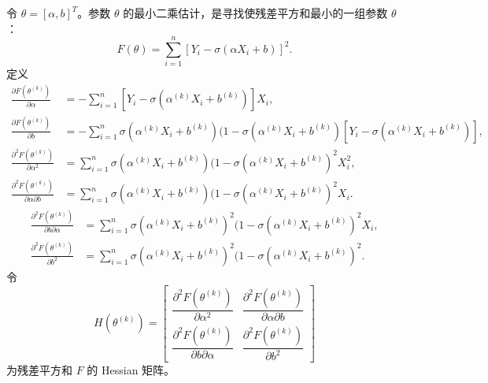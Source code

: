 令 $\theta=[\alpha,b]^T$。参数 $\theta$ 的最小二乘估计，是寻找使残差平方和最小的一组参数 $\theta$：
\begin{equation}
F(\theta)=\sum_{i=1}^n[Y_i-\sigma(\alpha X_i+b)]^2.
\tag{5.13}
\end{equation}
定义
\begin{equation}
\begin{aligned}
\frac{\partial F(\theta^{(k)})}{\partial\alpha}
&=-\sum_{i=1}^n[Y_i-\sigma(\alpha^{(k)}X_i+b^{(k)})]X_i,\\
\frac{\partial F(\theta^{(k)})}{\partial b}
&=-\sum_{i=1}^n\sigma(\alpha^{(k)}X_i+b^{(k)})(1-\sigma(\alpha^{(k)}X_i+b^{(k)})
[Y_i-\sigma(\alpha^{(k)}X_i+b^{(k)})],\\
\frac{\partial^2F(\theta^{(k)})}{\partial\alpha^2}
&=\sum_{i=1}^n\sigma(\alpha^{(k)}X_i+b^{(k)})(1-\sigma(\alpha^{(k)}X_i+b^{(k)})^2X_i^2,\\
\frac{\partial^2F(\theta^{(k)})}{\partial\alpha\partial b}
&=\sum_{i=1}^n\sigma(\alpha^{(k)}X_i+b^{(k)})(1-\sigma(\alpha^{(k)}X_i+b^{(k)})^2X_i.
\end{aligned}
\tag{5.14}
\end{equation}
\[
\begin{aligned}
\frac{\partial^2F(\theta^{(k)})}{\partial b\partial\alpha}
&=\sum_{i=1}^n\sigma(\alpha^{(k)}X_i+b^{(k)})^2(1-\sigma(\alpha^{(k)}X_i+b^{(k)})^2X_i,\\
\frac{\partial^2F(\theta^{(k)})}{\partial b^2}
&=\sum_{i=1}^n\sigma(\alpha^{(k)}X_i+b^{(k)})^2(1-\sigma(\alpha^{(k)}X_i+b^{(k)})^2.
\end{aligned}
\]
令
\begin{equation}
H(\theta^{(k)})=
\begin{bmatrix}
\dfrac{\partial^2F(\theta^{(k)})}{\partial\alpha^2}
&\dfrac{\partial^2F(\theta^{(k)})}{\partial\alpha\partial b}\\[6pt]
\dfrac{\partial^2F(\theta^{(k)})}{\partial b\partial\alpha}
&\dfrac{\partial^2F(\theta^{(k)})}{\partial b^2}
\end{bmatrix}
\tag{5.15}
\end{equation}
为残差平方和 $F$ 的 Hessian 矩阵。

